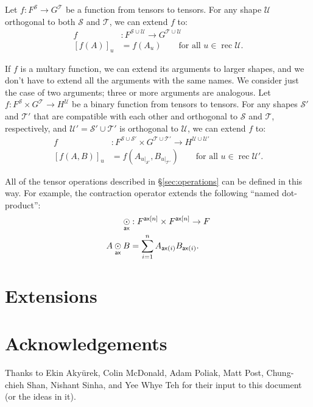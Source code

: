 \documentclass{article}
\DeclareMathOperator{\rec}{rec}
\newcommand{\restrict}[2]{\left.#1\right|_{#2}}
\begin{document}
Let $f \colon F^{\mathcal{S}} \rightarrow G^{\mathcal{T}}$ be a function from tensors to tensors. For any shape $\mathcal{U}$ orthogonal to both $\mathcal{S}$ and $\mathcal{T}$, we can extend $f$ to:
\begin{align*}
f &: F^{\mathcal{S} \cup \mathcal{U}} \rightarrow G^{\mathcal{T} \cup \mathcal{U}} \\
[f(A)]_u &= f(A_u) \qquad \text{for all $u \in \rec\mathcal{U}$.}
\end{align*}

If $f$ is a multary function, we can extend its arguments to larger shapes, and we don't have to extend all the arguments with the same names. We consider just the case of two arguments; three or more arguments are analogous. Let $f \colon F^{\mathcal{S}} \times G^{\mathcal{T}} \rightarrow H^{\mathcal{U}}$ be a binary function from tensors to tensors. For any shapes $\mathcal{S'}$ and $\mathcal{T'}$ that are compatible with each other and orthogonal to $\mathcal{S}$ and $\mathcal{T}$, respectively, and $\mathcal{U'} = \mathcal{S'} \cup \mathcal{T'}$ is orthogonal to $\mathcal{U}$, we can extend $f$ to:
\begin{align*}
f &: F^{\mathcal{S} \cup \mathcal{S'}} \times G^{\mathcal{T} \cup \mathcal{T'}} \rightarrow H^{\mathcal{U} \cup \mathcal{U'}} \\
  [f(A,B)]_u &= f\left(A_{\restrict{u}{\mathcal{S'}}},B_{\restrict{u}{\mathcal{T'}}}\right) \qquad \text{for all $u \in \rec\mathcal{U'}$.}
\end{align*}

All of the tensor operations described in \S\ref{sec:operations} can be defined in this way. For example, the contraction operator extends the following ``named dot-product'':
\begin{align*}
\mathbin{\underset{\mathsf{ax}}{\odot}} &: F^{\mathsf{ax}[n]} \times F^{\mathsf{ax}[n]} \rightarrow F \\
A \mathbin{\underset{\mathsf{ax}}{\odot}} B &= \sum_{i=1}^n A_{\mathsf{ax}(i)} B_{\mathsf{ax}(i)}.
\end{align*}

\section{Extensions}





\section*{Acknowledgements}

Thanks to Ekin Aky\"{u}rek, Colin McDonald, Adam Poliak, Matt Post, Chung-chieh Shan, Nishant Sinha, and Yee Whye Teh for their input to this document (or the ideas in it).

\iffalse %
\section*{References}
\fi



\end{document}
